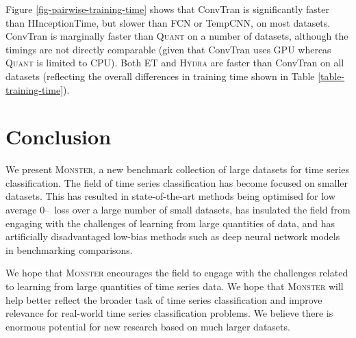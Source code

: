 \documentclass[twoside,11pt,preprint]{article}
\newcommand{\monster}{\textsc{Monster}}
\newcommand{\zo}{\mbox{0--\!1}~loss}
\newcommand{\quant}{\textsc{Quant}}
\newcommand{\hydra}{\textsc{Hydra}}
\begin{document}
Figure \ref{fig-pairwise-training-time} shows that ConvTran is significantly faster than HInceptionTime, but slower than FCN or TempCNN, on most datasets. ConvTran is marginally faster than {\quant} on a number of datasets, although the timings are not directly comparable (given that ConvTran uses GPU whereas {\quant} is limited to CPU). Both ET and {\hydra} are faster than ConvTran on all datasets (reflecting the overall differences in training time shown in Table \ref{table-training-time}).


\section{Conclusion} \label{sec-conclusion}

We present {\monster}, a new benchmark collection of large datasets for time series classification. The field of time series classification has become focused on smaller datasets. This has resulted in state-of-the-art methods being optimised for low average {\zo} over a large number of small datasets, has insulated the field from engaging with the challenges of learning from large quantities of data, and has artificially disadvantaged low-bias methods such as deep neural network models in benchmarking comparisons.

We hope that {\monster} encourages the field to engage with the challenges related to learning from large quantities of time series data. We hope that {\monster} will help better reflect the broader task of time series classification and improve relevance for real-world time series classification problems. We believe there is enormous potential for new research based on much larger datasets.

\end{document}
